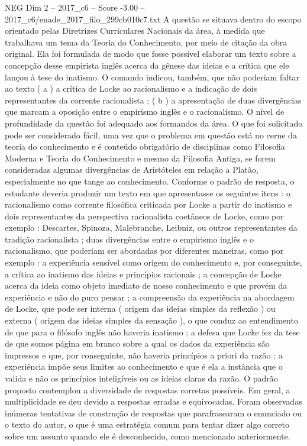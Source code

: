\begin{textsample}{NEG Dim 2 – 2017\_c6 – Score -3.00 – 2017\_c6/enade\_2017\_filo\_299cb010c7.txt}
A questão se situava dentro do escopo orientado pelas Diretrizes Curriculares Nacionais da área, à medida que trabalhava um tema da Teoria do Conhecimento, por meio de citação da obra original.
Ela foi formulada de modo que fosse possível elaborar um texto sobre a concepção desse empirista inglês acerca da gênese das ideias e a crítica que ele lançou à tese do inatismo.
O comando indicou, também, que não poderiam faltar ao texto ( a ) a crítica de Locke ao racionalismo e a indicação de dois representantes da corrente racionalista ; ( b ) a apresentação de duas divergências que marcam a oposição entre o empirismo inglês e o racionalismo.
O nível de profundidade da questão foi adequado aos formandos da área.
O que foi solicitado pode ser considerado fácil, uma vez que o problema em questão está no cerne da teoria do conhecimento e é conteúdo obrigatório de disciplinas como Filosofia Moderna e Teoria do Conhecimento e mesmo da Filosofia Antiga, se forem consideradas algumas divergências de Aristóteles em relação a Platão, especialmente no que tange ao conhecimento.
Conforme o padrão de resposta, o estudante deveria produzir um texto em que apresentasse os seguintes itens : o racionalismo como corrente filosófica criticada por Locke a partir do inatismo e dois representantes da perspectiva racionalista coetâneos de Locke, como por exemplo : Descartes, Spinoza, Malebranche, Leibniz, ou outros representantes da tradição racionalista ; duas divergências entre o empirismo inglês e o racionalismo, que poderiam ser abordadas por diferentes maneiras, como por exemplo : a experiência sensível como origem do conhecimento e, por conseguinte, a crítica ao inatismo das ideias e princípios racionais ; a concepção de Locke acerca da ideia como objeto imediato de nosso conhecimento e que provém da experiência e não do puro pensar ; a compreensão da experiência na abordagem de Locke, que pode ser interna ( origem das ideias simples da reflexão ) ou externa ( origem das ideias simples da sensação ), o que conduz ao entendimento de que para o filósofo inglês não haveria inatismo ; a defesa que Locke fez da tese de que somos página em branco sobre a qual os dados da experiência são impressos e que, por conseguinte, não haveria princípios a priori da razão ; a experiência impõe seus limites ao conhecimento e que é ela a instância que o valida e não os princípios inteligíveis ou as ideias claras da razão.
O padrão proposto contemplou a diversidade de respostas corretas possíveis.
Em geral, a multiplicidade se deu devido a respostas erradas e equivocadas.
Foram observadas inúmeras tentativas de construção de respostas que parafrasearam o enunciado ou o texto do autor, o que é uma estratégia comum para tentar dizer algo correto sobre um assunto quando ele é desconhecido, como mencionado anteriormente.

\end{textsample}
